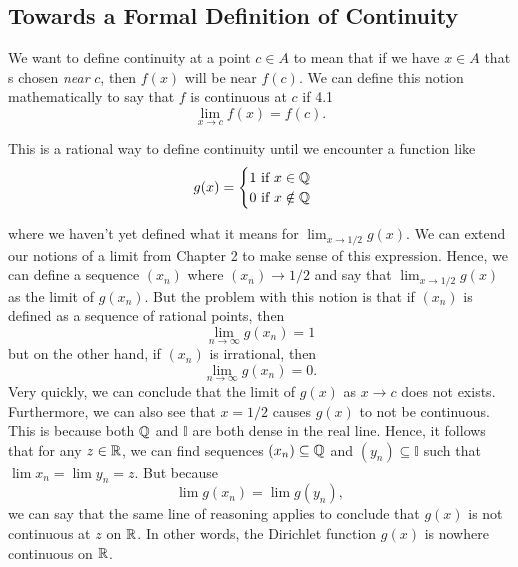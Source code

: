 
\subsection{Towards a Formal Definition of Continuity}

We want to define continuity at a point \( c \in A  \) to mean that if we have \( x \in A  \) that s chosen \textit{near} \( c \), then \( f(x) \) will be near \( f(c) \). We can define this notion mathematically to say that \( f \) is continuous at \( c  \) if 4.1
\[  \lim_{ x  \to  c } f(x) = f(c). \]

This is a rational way to define continuity until we encounter a function like 
\[ g(x) = 
\begin{cases}
    1 ~ \text{if} ~ x \in \mathbb{Q}  \\
    0 ~ \text{if} ~ x \notin \mathbb{Q} 
\end{cases} \]
 
where we haven't yet defined what it means for \( \lim_{x \to 1/2} g(x) \). We can extend our notions of a limit from Chapter 2 to make sense of this expression. Hence, we can define a sequence \( (x_n) \) where \( (x_n) \to 1/2  \) and say that \( \lim_{ x \to 1/2 } g(x) \) as the limit of \( g(x_n) \). But the problem with this notion is that if \( (x_n) \) is defined as a sequence of rational points, then 
\[  \lim_{ n \to \infty} g(x_n) = 1  \]
but on the other hand, if \( (x_n) \) is irrational, then 
\[  \lim_{ n \to \infty  } g(x_n) = 0. \]
Very quickly, we can conclude that the limit of \( g(x) \) as \( x \to c  \) does not exists. Furthermore, we can also see that \( x = 1/2 \) causes \( g(x) \) to not be continuous. This is because both \( \mathbb{Q}  \) and \( \mathbb{I} \) are both dense in the real line. Hence, it follows that for any \( z \in \mathbb{R}  \), we can find sequences \( (x_n) \subseteq \mathbb{Q}  \) and \( (y_n) \subseteq \mathbb{I} \) such that 
\( \lim x_n = \lim y_n = z.  \) But because 
\[  \lim g(x_n) = \lim g(y_n),  \]
we can say that the same line of reasoning applies to conclude that \( g(x) \) is not continuous at \( z  \) on \( \mathbb{R}  \). In other words, the Dirichlet function \( g(x) \) is nowhere continuous on \( \mathbb{R}  \).

